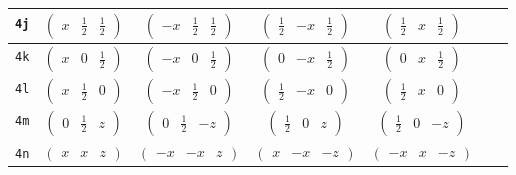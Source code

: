 \documentclass[fleqn,9pt,landscape]{jsarticle}
\begin{document}
\begin{center}
\begin{longtable}{ccccccc}
{\tt 4j} & $ \begin{pmatrix} x & \frac{1}{2} & \frac{1}{2} \end{pmatrix} $ & $ \begin{pmatrix} - x & \frac{1}{2} & \frac{1}{2} \end{pmatrix} $ & $ \begin{pmatrix} \frac{1}{2} & - x & \frac{1}{2} \end{pmatrix} $ & $ \begin{pmatrix} \frac{1}{2} & x & \frac{1}{2} \end{pmatrix} $ & $  $ & $  $ \\ \hline
{\tt 4k} & $ \begin{pmatrix} x & 0 & \frac{1}{2} \end{pmatrix} $ & $ \begin{pmatrix} - x & 0 & \frac{1}{2} \end{pmatrix} $ & $ \begin{pmatrix} 0 & - x & \frac{1}{2} \end{pmatrix} $ & $ \begin{pmatrix} 0 & x & \frac{1}{2} \end{pmatrix} $ & $  $ & $  $ \\ \hline
{\tt 4l} & $ \begin{pmatrix} x & \frac{1}{2} & 0 \end{pmatrix} $ & $ \begin{pmatrix} - x & \frac{1}{2} & 0 \end{pmatrix} $ & $ \begin{pmatrix} \frac{1}{2} & - x & 0 \end{pmatrix} $ & $ \begin{pmatrix} \frac{1}{2} & x & 0 \end{pmatrix} $ & $  $ & $  $ \\ \hline
{\tt 4m} & $ \begin{pmatrix} 0 & \frac{1}{2} & z \end{pmatrix} $ & $ \begin{pmatrix} 0 & \frac{1}{2} & - z \end{pmatrix} $ & $ \begin{pmatrix} \frac{1}{2} & 0 & z \end{pmatrix} $ & $ \begin{pmatrix} \frac{1}{2} & 0 & - z \end{pmatrix} $ & $  $ & $  $ \\ \hline
{\tt 4n} & $ \begin{pmatrix} x & x & z \end{pmatrix} $ & $ \begin{pmatrix} - x & - x & z \end{pmatrix} $ & $ \begin{pmatrix} x & - x & - z \end{pmatrix} $ & $ \begin{pmatrix} - x & x & - z \end{pmatrix} $ & $  $ & $  $ \\ \hline

\end{longtable}
\end{center}
\end{document}

